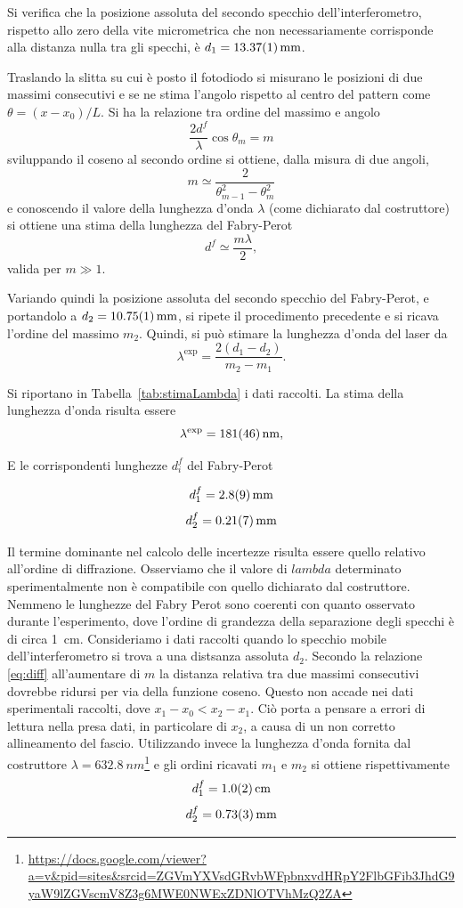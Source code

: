 \documentclass[10pt,oneside,a4paper]{article}
\begin{document}
\begin{multicols}{2}
Si verifica che la posizione assoluta del secondo specchio dell'interferometro, rispetto allo zero della vite micrometrica che non necessariamente corrisponde alla distanza nulla tra gli specchi, è $d_1 = \SI{13.37 \pm 0.01}{mm}$.

Traslando la slitta su cui è posto il fotodiodo si misurano le posizioni di due massimi consecutivi e se ne stima l'angolo rispetto al centro del pattern come $\theta = (x-x_0) / L$. Si ha la relazione tra ordine del massimo e angolo 
\begin{equation}\label{eq:diff}
\frac{2d^f}{\lambda} \cos{\theta_m} = m
\end{equation}
sviluppando il coseno al secondo ordine si ottiene, dalla misura di due angoli,
\[
m \simeq \frac{2}{\theta_{m-1}^2 - \theta_{m}^2}
\]
e conoscendo il valore della lunghezza d'onda $\lambda$ (come dichiarato dal costruttore) si ottiene una stima della lunghezza del Fabry-Perot
\[
d^f \simeq \frac{m \lambda}{2},
\]
valida per $m \gg 1$.

Variando quindi la posizione assoluta del secondo specchio del Fabry-Perot, e portandolo a $d_2 = \SI{10.75 \pm 0.01}{mm}$, si ripete il procedimento precedente e si ricava l'ordine del massimo $m_2$. Quindi, si può stimare la lunghezza d'onda del laser da \[
\lambda^{\text{exp}} = \frac{2(d_1 - d_2)}{m_2 - m_1}.
\]

Si riportano in Tabella~\ref{tab:stimaLambda} i dati raccolti. La stima della lunghezza d'onda risulta essere
\[
\lambda^{\text{exp}} = \SI{ 181 \pm 46}{nm},
\]

E le corrispondenti lunghezze $d_i^f$ del Fabry-Perot

$$d_1^f = \SI{2.8 \pm 0.9}{mm}$$
$$d_2^f = \SI{0.21 \pm 0.07}{mm}$$

Il termine dominante nel calcolo delle incertezze risulta essere quello relativo all'ordine di diffrazione. Osserviamo che il valore di $lambda$ determinato sperimentalmente non è compatibile con quello dichiarato dal costruttore. Nemmeno le lunghezze del Fabry Perot sono coerenti con quanto osservato durante l'esperimento, dove l'ordine di grandezza della separazione degli specchi è di circa \SI{1}{cm}. Consideriamo i dati raccolti quando lo specchio mobile dell'interferometro si trova a una distsanza assoluta $d_2$. Secondo la relazione \ref{eq:diff} all'aumentare di $m$ la distanza relativa tra due massimi consecutivi dovrebbe ridursi per via della funzione coseno. Questo non accade nei dati sperimentali raccolti, dove $x_1-x_0 < x_2-x_1$. Ciò porta a pensare a errori di lettura nella presa dati, in particolare di $x_2$, a causa di un non corretto allineamento del fascio.
Utilizzando invece la lunghezza d'onda fornita dal costruttore $\lambda = \SI{632.8}{nm}$\footnote{\url{https://docs.google.com/viewer?a=v&pid=sites&srcid=ZGVmYXVsdGRvbWFpbnxvdHRpY2FlbGFib3JhdG9yaW9lZGVscmV8Z3g6MWE0NWExZDNlOTVhMzQ2ZA}} e gli ordini ricavati $m_1$ e $m_2$ si ottiene rispettivamente
$$d_1^f = \SI{1 \pm 0.2}{cm} $$
$$d_2^f = \SI{0.73 \pm 0.03}{mm}$$


\end{multicols}
\end{document}
